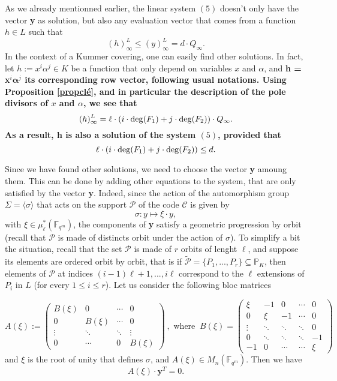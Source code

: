 \documentclass[10pt]{article}
\newcommand{\s}{\vspace{0.3cm}}
\newcommand{\cd}{\cdot}
\newcommand{\PP}{\mathbb{P}}
\newcommand{\fqm}{\mathbb{F}_{q^m}}
\newcommand{\su}{\subseteq}
\newcommand{\PR}{\mathcal{P}}
\begin{document}
\s

As we already mentionned earlier, the linear system $(5)$ doesn't only have the vector \textbf{y} as solution, but also any evaluation vector that comes from a function $h \in L$ such that 
\[(h)^L_{\infty} \leq (y)^L_{\infty} = d \cd Q_{\infty}.\]
In the context of a Kummer covering, one can easily find other solutions. In fact, let $h := x^i\alpha^j \in K$ be a function that only depend on variables $x$ and $\alpha$, and \bf{h} \rm = \textbf{x}$^i\boldsymbol{\alpha}^j$ \rm its corresponding row vector, following usual notations. Using Proposition \ref{propclé}, and in particular the description of the pole divisors of $x$ and $\alpha$, we see that 
\[ (h)^L_{\infty} = \ell \cd \left(i \cd \deg(F_1)+j \cd \deg(F_{\rm 2})\right) \cd Q_{\infty}.\]
As a result, \bf{h} \rm is also a solution of the system $(5)$, provided that
\[\ell \cd \left(i \cd \deg(F_1)+j \cd \deg(F_{\rm 2})\right) \leq d.\]


\s

Since we have found other solutions, we need to choose the vector \textbf{y} amoung them. This can be done by adding other equations to the system, that are only satisfied by the vector \textbf{y}. Indeed, since the action of the automorphism group $\Sigma = \langle\sigma\rangle$ that acts on the support $\PR$ of the code $\mathcal{C}$ is given by 
\[\sigma : y \longmapsto \xi \cd y,\]
with $\xi \in \mu^*_{\ell}(\fqm)$, the components of \textbf{y} satisfy a geometric progression by orbit (recall that $\PR$ is made of distincts orbit under the action of $\sigma$). To simplify a bit the situation, recall that the set $\PR$ is made of $r$ orbits of lenght $\ell$, and suppose its elements are ordered orbit by orbit, that is if $\tilde{\PR} = \{P_1,...,P_r\} \su \PP_K$, then elements of $\PR$ at indices $(i-1)\ell+1,...,i\ell$ correspond to the $\ell$ extensions of $P_{i}$ in $L$ (for every $1\leq i \leq r$). Let us consider the following bloc matrices

\begin{equation*} 
A(\xi) := 
\begin{pmatrix}
B(\xi) & 0 & \cdots & 0 \\
0 & B(\xi) & \cdots & 0 \\
\vdots & \ddots & \ddots & \vdots \\
0 & \cdots & 0 & B(\xi)
\end{pmatrix} \ , \textrm{ where }\ 
B(\xi) = 
\begin{pmatrix}
\xi & -1 & 0 & \cdots & 0 \\
0 & \xi & -1 & \cdots & 0 \\
\vdots & \ddots & \ddots & \ddots & 0 \\
0 & \ddots & \ddots & \ddots & -1 \\
-1 & 0 & \cdots & \cdots & \xi
\end{pmatrix}
\end{equation*}
and $\xi$ is the root of unity that defines $\sigma$, and $A(\xi) \in M_{n}(\fqm)$. Then we have
\begin{equation*}
A(\xi) \cd \textbf{y}^T
= 0.
\end{equation*}
\end{document}
